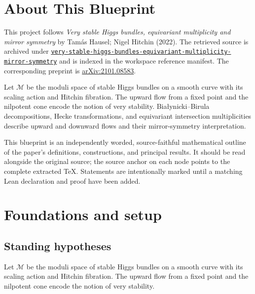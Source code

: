 

\chapter*{About This Blueprint}
\label{very-stable-higgs-bundles-equivariant-multiplicity-mirror-symmetry-about}

This project follows \emph{Very stable Higgs bundles, equivariant multiplicity and mirror symmetry} by Tamás Hausel; Nigel Hitchin (2022). The
retrieved source is archived under
\href{../../../../../references/very-stable-higgs-bundles-equivariant-multiplicity-mirror-symmetry/}{\texttt{very-stable-higgs-bundles-equivariant-multiplicity-mirror-symmetry}} and is indexed in
the workspace reference manifest. The corresponding preprint is
\href{https://arxiv.org/abs/2101.08583}{arXiv:2101.08583}.

Let $\mathcal M$ be the moduli space of stable Higgs bundles on a smooth curve with its scaling action and Hitchin fibration. The upward flow from a fixed point and the nilpotent cone encode the notion of very stability. Białynicki--Birula decompositions, Hecke transformations, and equivariant intersection multiplicities describe upward and downward flows and their mirror-symmetry interpretation.

This blueprint is an independently worded, source-faithful mathematical
outline of the paper's definitions, constructions, and principal results. It
should be read alongside the original source; the source anchor on each node
points to the complete extracted TeX. Statements are intentionally marked
\notready until a matching Lean declaration and proof have been added.

\chapter{Foundations and setup}
\label{chap:very-stable-higgs-bundles-equivariant-multiplicity-mirror-symmetry-foundations}

\section{Standing hypotheses}
\label{sec:very-stable-higgs-bundles-equivariant-multiplicity-mirror-symmetry-standing}

Let $\mathcal M$ be the moduli space of stable Higgs bundles on a smooth curve with its scaling action and Hitchin fibration. The upward flow from a fixed point and the nilpotent cone encode the notion of very stability.

